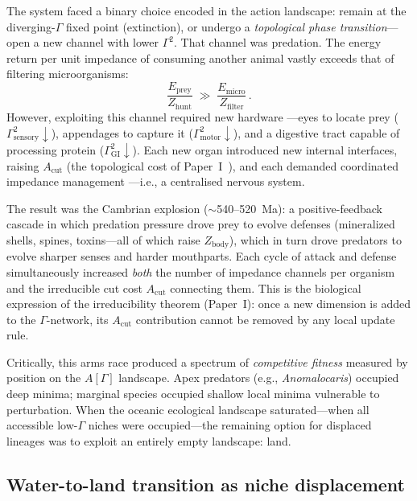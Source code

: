 ﻿\documentclass[aps,pre,twocolumn,superscriptaddress,floatfix]{revtex4-2}
\begin{document}
The system faced a binary choice encoded in the
action landscape: remain at the diverging-$\Gamma$ fixed
point (extinction), or undergo a \emph{topological phase
transition}---open a new channel with lower $\Gamma^2$.
That channel was predation.
The energy return per unit impedance of consuming another
animal vastly exceeds that of filtering microorganisms:
\begin{equation}
  \frac{E_{\mathrm{prey}}}{Z_{\mathrm{hunt}}}
  \;\gg\;
  \frac{E_{\mathrm{micro}}}{Z_{\mathrm{filter}}}\,.
  \label{eq:predation-advantage}
\end{equation}
However, exploiting this channel required new hardware
---eyes to locate prey ($\Gamma_{\mathrm{sensory}}^2\!\downarrow$),
appendages to capture it ($\Gamma_{\mathrm{motor}}^2\!\downarrow$),
and a digestive tract capable of processing protein
($\Gamma_{\mathrm{GI}}^2\!\downarrow$).
Each new organ introduced new internal interfaces,
raising $A_{\mathrm{cut}}$
(the topological cost of Paper~I~\cite{PaperI}),
and each demanded coordinated impedance management
---i.e., a centralised nervous system.

The result was the Cambrian explosion ($\sim$540--520~Ma):
a positive-feedback cascade in which
predation pressure drove prey to evolve defenses
(mineralized shells, spines, toxins---all of which raise
$Z_{\mathrm{body}}$),
which in turn drove predators to evolve sharper senses
and harder mouthparts.
Each cycle of attack and defense simultaneously increased
\emph{both} the number of impedance channels per organism
and the irreducible cut cost $A_{\mathrm{cut}}$ connecting them.
This is the biological expression of the irreducibility
theorem (Paper~I): once a new dimension is added to the
$\Gamma$-network, its $A_{\mathrm{cut}}$ contribution
cannot be removed by any local update rule.

Critically, this arms race produced a spectrum of
\emph{competitive fitness} measured by position on the
$A[\Gamma]$ landscape.
Apex predators (e.g., \emph{Anomalocaris}) occupied
deep minima; marginal species occupied shallow local
minima vulnerable to perturbation.
When the oceanic ecological landscape saturated---when
all accessible low-$\Gamma$ niches were occupied---the
remaining option for displaced lineages was to
exploit an entirely empty landscape: land.

\subsection{Water-to-land transition as niche displacement}
\label{sec:water-land}
\end{document}

